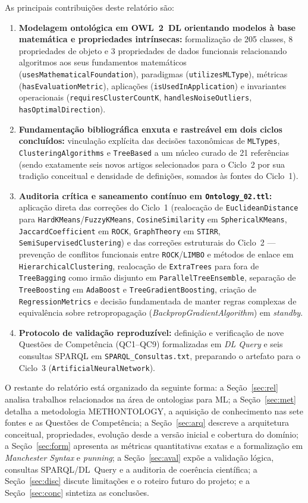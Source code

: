 \documentclass[11pt,a4paper]{article}
\newcommand{\onto}[1]{\texttt{#1}}
\begin{document}
As principais contribuições deste relatório são:
\begin{enumerate}[leftmargin=*,nosep]
  \item \textbf{Modelagem ontológica em OWL~2~DL orientando modelos à base matemática e propriedades intrínsecas:} formalização de 205 classes, 8 propriedades de objeto e 3 propriedades de dados funcionais relacionando algoritmos aos seus fundamentos matemáticos (\onto{usesMathematicalFoundation}), paradigmas (\onto{utilizesMLType}), métricas (\onto{hasEvaluationMetric}), aplicações (\onto{isUsedInApplication}) e invariantes operacionais (\onto{requiresClusterCountK}, \onto{handlesNoiseOutliers}, \onto{hasOptimalDirection}).
  \item \textbf{Fundamentação bibliográfica enxuta e rastreável em dois ciclos concluídos:} vinculação explícita das decisões taxonômicas de \onto{MLTypes}, \onto{ClusteringAlgorithms} e \onto{TreeBased} a um núcleo curado de 21 referências (sendo exatamente seis novos artigos selecionados para o Ciclo~2 por sua tradição conceitual e densidade de definições, somados às fontes do Ciclo~1).
  \item \textbf{Auditoria crítica e saneamento contínuo em \texttt{Ontology\_02.ttl}:} aplicação direta das correções do Ciclo~1 (realocação de \onto{EuclideanDistance} para \onto{HardKMeans}/\onto{FuzzyKMeans}, \onto{CosineSimilarity} em \onto{SphericalKMeans}, \onto{JaccardCoefficient} em \onto{ROCK}, \onto{GraphTheory} em \onto{STIRR}, \onto{SemiSupervisedClustering}) e das correções estruturais do Ciclo~2 --- prevenção de conflitos funcionais entre \onto{ROCK}/\onto{LIMBO} e métodos de enlace em \onto{HierarchicalClustering}, realocação de \onto{ExtraTrees} para fora de \onto{TreeBagging} como irmão disjunto em \onto{ParallelTreeEnsemble}, separação de \onto{TreeBoosting} em \onto{AdaBoost} e \onto{TreeGradientBoosting}, criação de \onto{RegressionMetrics} e decisão fundamentada de manter regras complexas de equivalência sobre retropropagação (\emph{BackpropGradientAlgorithm}) em \emph{standby}.
  \item \textbf{Protocolo de validação reproduzível:} definição e verificação de nove Questões de Competência (QC1--QC9) formalizadas em \emph{DL Query} e seis consultas SPARQL em \texttt{SPARQL\_Consultas.txt}, preparando o artefato para o Ciclo~3 (\onto{ArtificialNeuralNetwork}).
\end{enumerate}

O restante do relatório está organizado da seguinte forma: a Seção~\ref{sec:rel} analisa trabalhos relacionados na área de ontologias para ML; a Seção~\ref{sec:met} detalha a metodologia METHONTOLOGY, a aquisição de conhecimento nas sete fontes e as Questões de Competência; a Seção~\ref{sec:arq} descreve a arquitetura conceitual, propriedades, evolução desde a versão inicial e cobertura do domínio; a Seção~\ref{sec:form} apresenta as métricas quantitativas exatas e a formalização em \emph{Manchester Syntax} e \emph{punning}; a Seção~\ref{sec:aval} expõe a validação lógica, consultas SPARQL/DL~Query e a auditoria de coerência científica; a Seção~\ref{sec:disc} discute limitações e o roteiro futuro do projeto; e a Seção~\ref{sec:conc} sintetiza as conclusões.
\end{document}

